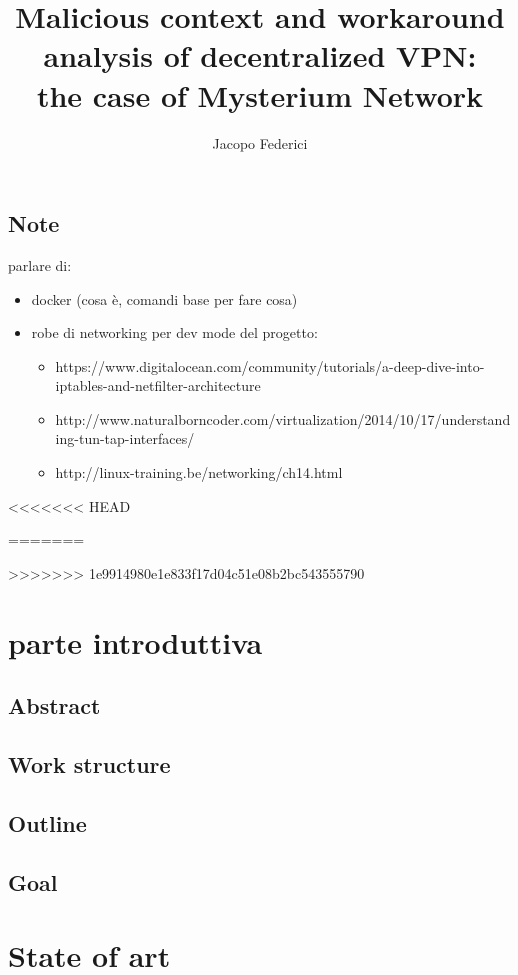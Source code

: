 \documentclass[]{article}
\title{Malicious context and workaround analysis of decentralized VPN:\\the case of Mysterium Network}
\author{Jacopo Federici}
\begin{document}
	\maketitle	
	\clearpage
	
	\tableofcontents{}

	\subsection{Note}
	parlare di:
	\begin{itemize}
		\item docker (cosa è, comandi base per fare cosa)
		\item robe di networking per dev mode del progetto:
		\begin{itemize}
			\item https://www.digitalocean.com/community/tutorials/a-deep-dive-into-iptables-and-netfilter-architecture
			\item http://www.naturalborncoder.com/virtualization/2014/10/17/understanding-tun-tap-interfaces/
			\item http://linux-training.be/networking/ch14.html
		\end{itemize}
	\end{itemize}
<<<<<<< HEAD
	
=======

>>>>>>> 1e9914980e1e833f17d04c51e08b2bc543555790
	\section{parte introduttiva}
		
	\subsection{Abstract}
	\subsection{Work structure}
	\subsection{Outline}
	\subsection{Goal}
	
	
	\section{State of art}
\end{document}
